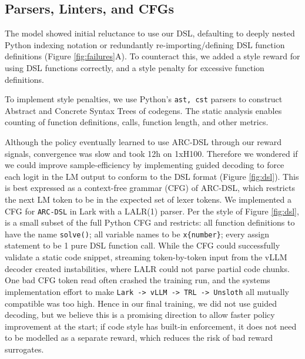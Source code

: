 \documentclass{article}
\begin{document}
\subsection{Parsers, Linters, and CFGs}

The model showed initial reluctance to use our DSL, defaulting to deeply nested Python indexing notation or redundantly re-importing/defining DSL function definitions (Figure \ref{fig:failures}A). To counteract this, we added a style reward for using DSL functions correctly, and a style penalty for excessive function definitions.

To implement style penalties, we use Python's \texttt{ast, cst} parsers to construct Abstract and Concrete Syntax Trees of codegens. The static analysis enables counting of function definitions, calls, function length, and other metrics.


Although the policy eventually learned to use ARC-DSL through our reward signals, convergence was slow and took 12h on 1xH100. Therefore we wondered if we could improve sample-efficiency by implementing guided decoding to force each logit in the LM output to conform to the DSL format (Figure \ref{fig:dsl}). This is best expressed as a context-free grammar (CFG) of ARC-DSL, which restricts the next LM token to be in the expected set of lexer tokens. We implemented a CFG for \texttt{ARC-DSL} in Lark with a LALR(1) parser. Per the style of Figure \ref{fig:dsl}, is a small subset of the full Python CFG and restricts: all function definitions to have the name \texttt{solve()}; all variable names to be \texttt{x\{number\}}; every assign statement to be 1 pure DSL function call. While the CFG could successfully validate a static code snippet, streaming token-by-token input from the vLLM decoder created instabilities, where LALR could not parse partial code chunks. One bad CFG token read often crashed the training run, and the systems implementation effort to make \texttt{Lark -> vLLM -> TRL -> Unsloth} all mutually compatible was too high. Hence in our final training, we did not use guided decoding, but we believe this is a promising direction to allow faster policy improvement at the start; if code style has built-in enforcement, it does not need to be modelled as a separate reward, which reduces the risk of bad reward surrogates.
\end{document}
